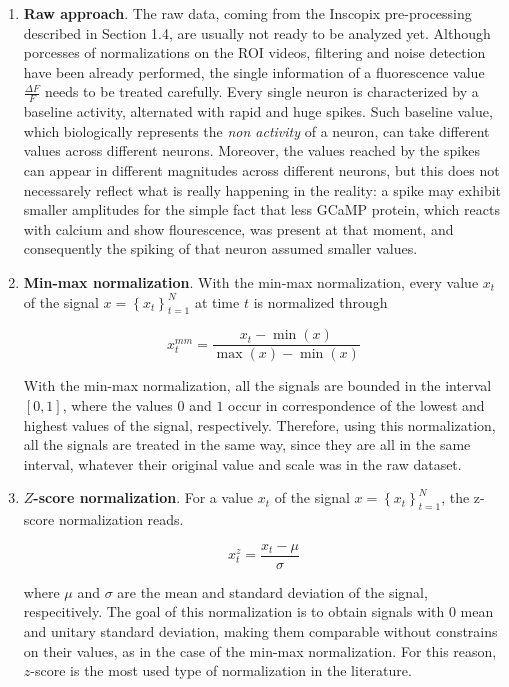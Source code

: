 \documentclass[12pt, a4paper]{article}
\begin{document}
\begin{enumerate}
	
	\item \textbf{Raw approach}. The raw data, coming from the Inscopix pre-processing described in Section 1.4, are usually not ready to be analyzed yet. Although porcesses of normalizations on the ROI videos, filtering and noise detection  have been already performed, the single information of a fluorescence value $\frac{\Delta F}{F}$ needs to be treated carefully. Every single neuron is characterized by a baseline activity, alternated with rapid and huge spikes. Such baseline value, which biologically represents the \textit{non activity} of a neuron, can take different values across different neurons. Moreover, the values reached by the spikes can appear in different magnitudes across different neurons, but this does not necessarely reflect  what is really happening in the reality: a spike may exhibit smaller amplitudes for the simple fact that less GCaMP protein, which reacts with calcium and show flourescence, was present at that moment, and consequently the spiking of that neuron assumed smaller values. 
	
	\item \textbf{Min-max normalization}. With the min-max normalization, every value $x_t$ of the signal $ x = \left\{ x_t\right\}_{t=1}^N$ at time $t$ is normalized through
	
	\begin{equation}
	x_t^{mm} = \frac{x_t -  \min(x)}{\max(x) - \min(x)}
	\end{equation}
	
	With the min-max normalization, all the signals are bounded in the interval $[0,1]$, where the values $0$ and $1$ occur in correspondence of the lowest and  highest values of the signal, respectively. Therefore, using this normalization, all the signals are treated in the same way, since they are all in the same interval, whatever their original value and scale was in the raw dataset.
	
	\item \textbf{$Z$-score normalization}. For a value  $x_t$ of the signal $ x = \left\{ x_t\right\}_{t=1}^N$, the z-score normalization reads. 
	
	\begin{equation}
	x_t^{z} = \frac{x_t -  \mu}{\sigma}
	\end{equation}
	
	where $\mu$ and $\sigma$ are the mean and standard deviation of the signal, respecitively. The goal of this normalization is to obtain signals with $0$  mean and unitary standard deviation, making them comparable without constrains on their values, as in the case of the min-max normalization. For this reason, $z$-score is the most used type of normalization in the literature.
	
	
\end{enumerate}
\end{document}

